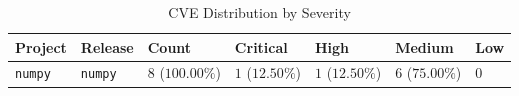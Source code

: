 \begin{table}
\caption{CVE Distribution by Severity}
\label{tab:cve-distribution}
\begin{tabular}{lllllll}
\toprule
Project & Release & Count & Critical & High & Medium & Low \\
\midrule
\texttt{numpy} & \texttt{numpy} & $8$ ($100.00\%$) & $1$ ($12.50\%$) & $1$ ($12.50\%$) & $6$ ($75.00\%$) & $0$ \\
\bottomrule
\end{tabular}
\end{table}
